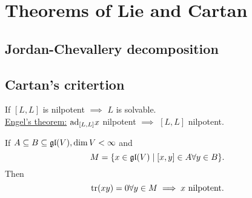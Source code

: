 \chapter{Theorems of Lie and Cartan}
\section{Jordan-Chevallery decomposition}

\section{Cartan's critertion}
\begin{remark}
    If $[L,L]$ is nilpotent $\implies$ $L$ is solvable.\\
    \underline{Engel's theorem:} $\text{ad}_{[L,L]}x$ nilpotent $\implies$ $[L,L]$ nilpotent.
\end{remark}
\begin{lemma}
    If
    $A \subseteq B \subseteq \mathfrak{gl}(V), \dim V < \infty$ and
    $$ M = \{x \in \mathfrak{gl}(V) \mid [x,y] \in A \forall y \in B\}.$$
    Then $$\operatorname{tr} (xy) = 0 \forall y \in M \implies x \text{ nilpotent.}$$
\end{lemma}
